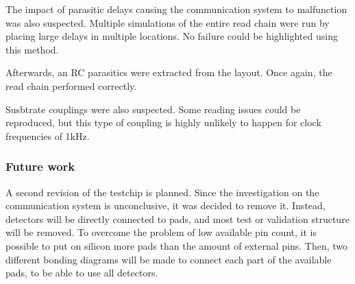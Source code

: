 The impact of parasitic delays causing the communication system to malfunction was also suspected.
Multiple simulations of the entire read chain were run by placing large delays in multiple locations.
No failure could be highlighted using this method.

Afterwards, an RC parasitics were extracted from the layout.
Once again, the read chain performed correctly.

Susbtrate couplings were also suspected.
Some reading issues could be reproduced, but this type of coupling is highly unlikely to happen for clock frequencies of 1kHz.


\subsubsection{Future work}

A second revision of the testchip is planned.
Since the investigation on the communication system is unconclusive, it was decided to remove it.
Instead, detectors will be directly connected to pads, and most test or validation structure will be removed.
To overcome the problem of low available pin count, it is possible to put on silicon more pads than the amount of external pins.
Then, two different bonding diagrams will be made to connect each part of the available pads, to be able to use all detectors.
